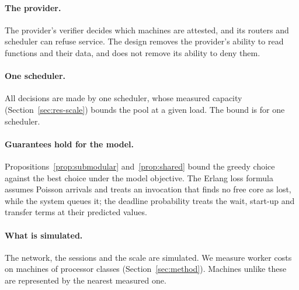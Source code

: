 \paragraph{The provider.} The provider's verifier decides which machines are attested, and its routers and scheduler
can refuse service. The design removes the provider's ability to read functions and their data, and does not remove
its ability to deny them.

\paragraph{One scheduler.} All decisions are made by one scheduler, whose measured capacity
(Section~\ref{sec:res-scale}) bounds the pool at a given load. The bound is for one scheduler.

\paragraph{Guarantees hold for the model.} Propositions~\ref{prop:submodular} and~\ref{prop:shared} bound the greedy
choice against the best choice under the model objective. The Erlang loss formula assumes Poisson arrivals and
treats an invocation that finds no free core as lost, while the system queues it; the deadline probability treats the
wait, start-up and transfer terms at their predicted values.

\paragraph{What is simulated.} The network, the sessions and the scale are simulated. We measure worker costs on
\VMachCount{} machines of \VMachProcClasses{} processor classes (Section~\ref{sec:method}). Machines unlike these
are represented by the nearest measured one.
